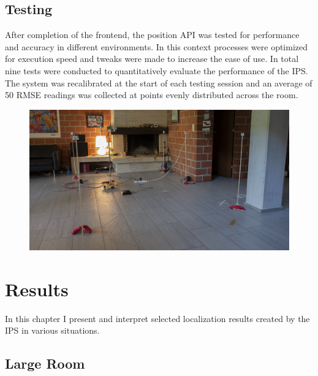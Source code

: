 \documentclass[a4paper, oneside]{ipsreport}
\begin{document}
\section{Testing}
After completion of the frontend, the position API was tested for performance and accuracy in different environments. In this context processes were optimized for execution speed and tweaks were made to increase the ease of use. In total nine tests were conducted to quantitatively evaluate the performance of the IPS. The system was recalibrated at the start of each testing session and an average of 50 RMSE readings was collected at points evenly distributed across the room.

\begin{figure}[h]
	\centering
	\includegraphics[width=\linewidth]{./figures/roomsetup.png}
	\label{fig:ipssetup}
\end{figure}


\chapter{Results}
\label{chapter:results}
In this chapter I present and interpret selected localization results created by the IPS in various situations.

\section{Large Room}
\label{subsection:fixedMSE}
\end{document}
